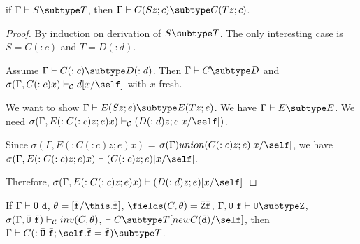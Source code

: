 \begin{lemma}
\label{lemmafive} %
if   $\Gamma \vdash S \subtype T$,
then $\Gamma \vdash C(S z; c) \subtype C(T z; c)$.
\end{lemma}

\begin{proof}
By induction on derivation of $S \subtype T$.
The only interesting case is $S = C(:c)$ and $T = D(:d)$.

Assume $\Gamma \vdash C(:c) \subtype D(:d)$.
Then $\Gamma \vdash C \subtype D$
and $\sigma(\Gamma, C(:c) x) \vdash_{\cal C} d[x/\self]$ with $x$ fresh.

We want to show $\Gamma \vdash E(S z; e) \subtype E(T z; e)$.
We have $\Gamma \vdash E \subtype E$.  We need
$\sigma(\Gamma, E(:C(:c) z; e) x) \vdash_{\cal C} (D(:d) z; e[x/\self])$.

Since $\sigma(\Gamma, E(:C(:c) z; e) x)$ =
$\sigma(\Gamma) union (C(:c) z; e)[x/\self]$, we have
$\sigma(\Gamma, E(:C(:c) z; e) x) \vdash (C(:c) z; e)[x/\self]$.


Therefore,
$\sigma(\Gamma, E(:C(:c) z; e) x) \vdash (D(:d) z; e)[x/\self]$
\end{proof}

\begin{lemma}
\label{lemmasix} %
If $\Gamma \vdash \bar{\tt U}\ \bar{\tt d}$,
$\theta = [\bar{\tt f} / \this.\bar{\tt f}]$,
$\fields(C,\theta) = \bar{\tt Z} \bar{\tt f}$,
$\Gamma, \bar{\tt U}\ \bar{\tt f} \vdash \bar{\tt U} \subtype \bar{\tt Z}$,
$\sigma(\Gamma, \bar{\tt U}\ \bar{\tt f}) \vdash_{\cal C} inv(C,\theta)$,
$\vdash C \subtype T[new C(\bar{\tt d}) / \self]$,
then $\Gamma \vdash C(: \bar{\tt U}\ \bar{\tt f}; \self.\bar{\tt f} = \bar{\tt f}) \subtype T$.
\end{lemma}

